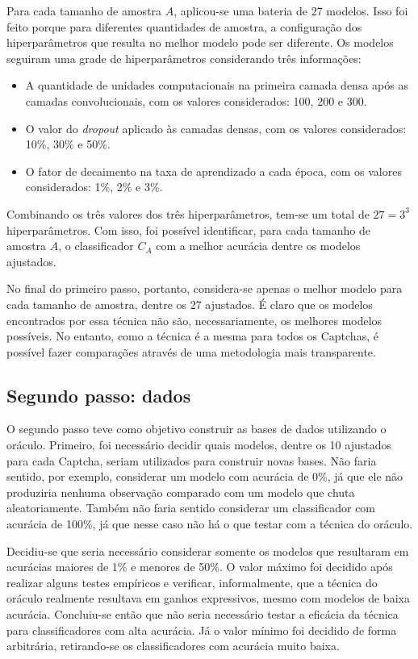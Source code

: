\documentclass[12pt,twoside,brazilian]{book}
\providecommand{\tightlist}{%
  \setlength{\itemsep}{0pt}\setlength{\parskip}{0pt}}
\begin{document}
Para cada tamanho de amostra \(A\), aplicou-se uma bateria de 27
modelos. Isso foi feito porque para diferentes quantidades de amostra, a
configuração dos hiperparâmetros que resulta no melhor modelo pode ser
diferente. Os modelos seguiram uma grade de hiperparâmetros considerando
três informações:

\begin{itemize}
\tightlist
\item
  A quantidade de unidades computacionais na primeira camada densa após
  as camadas convolucionais, com os valores considerados: 100, 200 e
  300.
\item
  O valor do \emph{dropout} aplicado às camadas densas, com os valores
  considerados: 10\%, 30\% e 50\%.
\item
  O fator de decaimento na taxa de aprendizado a cada época, com os
  valores considerados: 1\%, 2\% e 3\%.
\end{itemize}

Combinando os três valores dos três hiperparâmetros, tem-se um total de
\(27=3^3\) hiperparâmetros. Com isso, foi possível identificar, para
cada tamanho de amostra \(A\), o classificador \(C_A\) com a melhor
acurácia dentre os modelos ajustados.

No final do primeiro passo, portanto, considera-se apenas o melhor
modelo para cada tamanho de amostra, dentre os 27 ajustados. É claro que
os modelos encontrados por essa técnica não são, necessariamente, os
melhores modelos possíveis. No entanto, como a técnica é a mesma para
todos os Captchas, é possível fazer comparações através de uma
metodologia mais transparente.

\hypertarget{segundo-passo-dados}{%
\subsection{Segundo passo: dados}\label{segundo-passo-dados}}

O segundo passo teve como objetivo construir as bases de dados
utilizando o oráculo. Primeiro, foi necessário decidir quais modelos,
dentre os 10 ajustados para cada Captcha, seriam utilizados para
construir novas bases. Não faria sentido, por exemplo, considerar um
modelo com acurácia de 0\%, já que ele não produziria nenhuma observação
comparado com um modelo que chuta aleatoriamente. Também não faria
sentido considerar um classificador com acurácia de 100\%, já que nesse
caso não há o que testar com a técnica do oráculo.

Decidiu-se que seria necessário considerar somente os modelos que
resultaram em acurácias maiores de 1\% e menores de 50\%. O valor máximo
foi decidido após realizar alguns testes empíricos e verificar,
informalmente, que a técnica do oráculo realmente resultava em ganhos
expressivos, mesmo com modelos de baixa acurácia. Concluiu-se então que
não seria necessário testar a eficácia da técnica para classificadores
com alta acurácia. Já o valor mínimo foi decidido de forma arbitrária,
retirando-se os classificadores com acurácia muito baixa.
\end{document}
